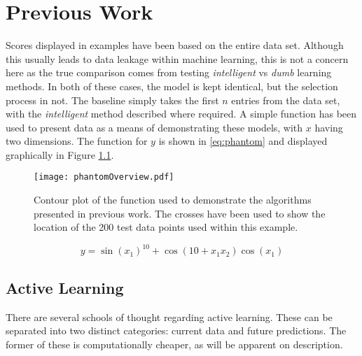 
\chapter{Previous Work}


\graphicspath{{Chapter2/Figs/Vector/}{Chapter2/Figs/}}


Scores displayed in examples have been based on the entire data set. Although this usually leads to data leakage within machine learning, this is not a concern here as the true comparison comes from testing  \textit{intelligent} vs \textit{dumb} learning methods. In both of these cases, the model is kept identical, but the selection process in not. The baseline simply takes the first $n$ entries from the data set, with the \textit{intelligent} method described where required. A simple function has been used to present data as a means of demonstrating these models, with $x$ having two dimensions. The function for $y$ is shown in \ref{eq:phantom} and displayed graphically in Figure \ref{fig:phantom}.


\begin{figure}[H]
  \begin{center}
    \texttt{[image: phantomOverview.pdf]}
    \caption{Contour plot of the function used to demonstrate the algorithms presented in previous work. The crosses have been used to show the location of the 200 test data points used within this example.}
    \label{fig:phantom}
  \end{center}
\end{figure}

\begin{equation}
  y = \sin{(x_1)}^{10} + \cos{(10 + x_1 x_2)}\cos{(x_1)}
  \label{eq:phantom}
\end{equation}

\section{Active Learning}
\label{ch:Active Learning}

There are several schools of thought regarding active learning. These can be separated into two distinct categories: current data and future predictions. The former of these is computationally cheaper, as will be apparent on description.


